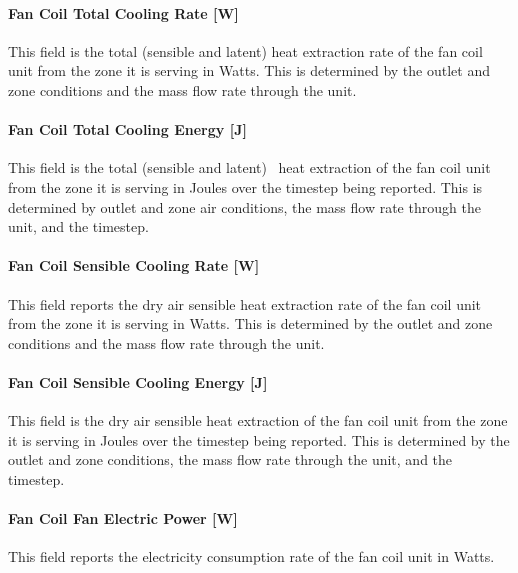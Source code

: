 \paragraph{Fan Coil Total Cooling Rate {[}W{]}}\label{fan-coil-total-cooling-rate-w}

This field is the total (sensible and latent) heat extraction rate of the fan coil unit from the zone it is serving in Watts. This is determined by the outlet and zone conditions and the mass flow rate through the unit.

\paragraph{Fan Coil Total Cooling Energy {[}J{]}}\label{fan-coil-total-cooling-energy-j}

This field is the total (sensible and latent)~ heat extraction of the fan coil unit from the zone it is serving in Joules over the timestep being reported. This is determined by outlet and zone air conditions, the mass flow rate through the unit, and the timestep.

\paragraph{Fan Coil Sensible Cooling Rate {[}W{]}}\label{fan-coil-sensible-cooling-rate-w}

This field reports the dry air sensible heat extraction rate of the fan coil unit from the zone it is serving in Watts. This is determined by the outlet and zone conditions and the mass flow rate through the unit.

\paragraph{Fan Coil Sensible Cooling Energy {[}J{]}}\label{fan-coil-sensible-cooling-energy-j}

This field is the dry air sensible heat extraction of the fan coil unit from the zone it is serving in Joules over the timestep being reported. This is determined by the outlet and zone conditions, the mass flow rate through the unit, and the timestep.

\paragraph{Fan Coil Fan Electric Power {[}W{]}}\label{fan-coil-fan-electric-power-w}

This field reports the electricity consumption rate of the fan coil unit in Watts.

